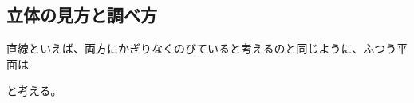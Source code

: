 \documentclass[
  12pt,a4paper,lualatex,ja=standard]{bxjsarticle}
\begin{document}
\newcommand{\myarc}[1]{
   \tikz [baseline = (N.base), every node/.style={}] {
      \node [inner sep = 0pt] (N) {$\mathrm{#1}$};
      \draw [line width = 0.4pt] plot [smooth, tension=1.3] coordinates {
         ($(N.north west) + (0.1ex,0)$)
         ($(N.north)      + (0,0.5ex)$)
         ($(N.north east) + (0,0)$)
      };
   }
}

\makeatletter
\newenvironment{figurehere}{\def\@captype{figure}}{}
\makeatother

\newcommand{\goku}[1]{\fbox{\phantom{\text{#1}} \quad}}

\hypertarget{ux7acbux4f53ux306eux898bux65b9ux3068ux8abfux3079ux65b9}{%
\subsection{立体の見方と調べ方}\label{ux7acbux4f53ux306eux898bux65b9ux3068ux8abfux3079ux65b9}}

直線といえば、両方にかぎりなくのびていると考えるのと同じように、ふつう平面は

\noindent
{}と考える。
\end{document}
